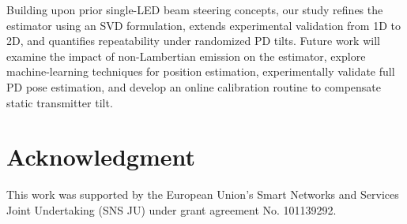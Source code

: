 \documentclass[conference]{IEEEtran}
\begin{document}
Building upon prior single-LED beam steering concepts, our study refines the estimator using an SVD formulation, extends experimental validation from 1D to 2D, and quantifies repeatability under randomized PD tilts. Future work will examine the impact of non-Lambertian emission on the estimator, explore machine-learning techniques for position estimation, experimentally validate full PD pose estimation, and develop an online calibration routine to compensate static transmitter tilt.

\section*{Acknowledgment} This work was supported by the European Union's Smart Networks and Services Joint Undertaking (SNS JU) under grant agreement No. 101139292.



\end{document}
